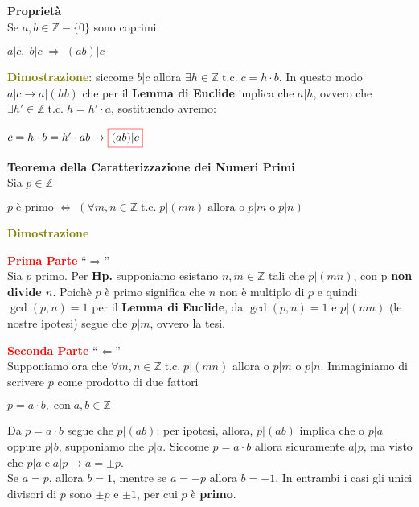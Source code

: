 \newpage
\begin{flushleft}
    \textbf{Proprietà} \\
    Se $a, b \in \mathbb{Z} - \{0\}$ sono coprimi

    {\centering
        $a|c, \; b|c \; \Rightarrow \; (ab)|c$
    \par}
\end{flushleft}
\begin{boxA}
    \textcolor{olive}{\textbf{Dimostrazione}}: siccome $b|c$ allora $\exists h \in \mathbb{Z} \; \text{t.c.} \; c = h \cdot b$. In questo modo $a|c \rightarrow a|(hb)$ che per il \textbf{Lemma di Euclide} implica che $a|h$, ovvero che $\exists h' \in \mathbb{Z} \; \text{t.c.} \; h = h' \cdot a$, sostituendo avremo:
    
    {\centering
        $c = h \cdot b = h' \cdot ab \rightarrow \fcolorbox{red}{white}{$(ab)|c$}$
    \par}
\end{boxA}

\begin{flushleft}
    \textbf{Teorema della Caratterizzazione dei Numeri Primi} \\
    Sia $p \in \mathbb{Z}$

    {\centering
        $p \; \text{è primo} \; \Longleftrightarrow \; (\forall m,n \in \mathbb{Z} \; \text{t.c.} \; p|(mn) \; \text{allora o} \; p|m \; \text{o} \; p|n)$
    \par}
\end{flushleft}
\begin{boxA}
    \textcolor{olive}{\textbf{Dimostrazione}}

    \textcolor{red}{\textbf{Prima Parte}} ``$\Rightarrow$'' \\
    Sia $p$ primo. Per \textbf{Hp.} supponiamo esistano $n, m \in \mathbb{Z}$ tali che $p|(mn)$, con p \textbf{non divide $n$}. Poichè $p$ è primo significa che $n$ non è multiplo di $p$ e quindi $\gcd (p, n) = 1$ per il \textbf{Lemma di Euclide}, da $\gcd (p, n) = 1$ e $p|(mn)$ (le nostre ipotesi) segue che $p|m$, ovvero la tesi.

    \textcolor{red}{\textbf{Seconda Parte}} ``$\Leftarrow$'' \\
    Supponiamo ora che $\forall m, n \in \mathbb{Z} \; \text{t.c.} \; p|(mn)$ allora o $p|m$ o $p|n$. Immaginiamo di scrivere $p$ come prodotto di due fattori
    
    {\centering
        $p = a \cdot b, \; \text{con} \; a, b \in \mathbb{Z}$
    \par}
    Da $p = a \cdot b$ segue che $p|(ab)$; per ipotesi, allora, $p|(ab)$ implica che o $p|a$ oppure $p|b$, supponiamo che $p|a$. Siccome $p = a \cdot b$ allora sicuramente $a|p$, ma visto che $p|a \; \text{e} \; a|p \rightarrow a = \pm p$. \\
    Se $a = p$, allora $b = 1$, mentre se $a = -p$ allora $b = -1$. In entrambi i casi gli unici divisori di $p$ sono $\pm p$ e $\pm 1$, per cui $p$ è \textbf{primo}.
\end{boxA}

